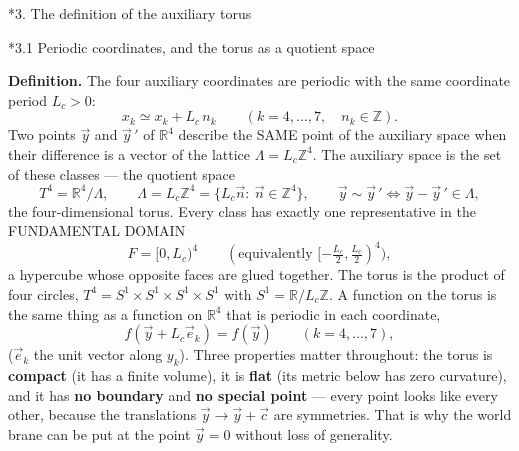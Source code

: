 \documentclass[10pt,a4paper]{article}
\makeatletter
\renewcommand\section{\@startsection{section}{1}{\z@}{-3.5ex \@plus -1ex \@minus -.2ex}{2.3ex \@plus.2ex}{\normalfont\Large\bfseries\raggedright}}
\renewcommand\subsection{\@startsection{subsection}{2}{\z@}{-3.25ex\@plus -1ex \@minus -.2ex}{1.5ex \@plus .2ex}{\normalfont\large\bfseries\raggedright}}
\makeatother
\begin{document}
\section*{3. The definition of the auxiliary torus}
\subsection*{3.1 Periodic coordinates, and the torus as a quotient space}
\textbf{Definition.} The four auxiliary coordinates are periodic with the same coordinate period $L_c>0$:
\begin{equation*}
x_k\simeq x_k+L_c\,n_k\qquad(k=4,\dots,7,\quad n_k\in\mathbb Z).
\end{equation*}
Two points $\vec y$ and $\vec y\,'$ of $\mathbb R^4$ describe the SAME point of the auxiliary space when their difference is a vector of the lattice $\Lambda=L_c\mathbb Z^4$. The auxiliary space is the set of these classes — the quotient space
\begin{equation*}
T^4=\mathbb R^4/\Lambda,\qquad \Lambda=L_c\mathbb Z^4=\{L_c\vec n:\ \vec n\in\mathbb Z^4\},\qquad \vec y\sim\vec y\,'\iff\vec y-\vec y\,'\in\Lambda,
\end{equation*}
the four-dimensional torus. Every class has exactly one representative in the FUNDAMENTAL DOMAIN
\begin{equation*}
F=[0,L_c)^4\qquad(\text{equivalently }[-\tfrac{L_c}2,\tfrac{L_c}2)^4),
\end{equation*}
a hypercube whose opposite faces are glued together. The torus is the product of four circles, $T^4=S^1\times S^1\times S^1\times S^1$ with $S^1=\mathbb R/L_c\mathbb Z$. A function on the torus is the same thing as a function on $\mathbb R^4$ that is periodic in each coordinate,
\begin{equation*}
f(\vec y+L_c\vec e_k)=f(\vec y)\qquad(k=4,\dots,7),
\end{equation*}
($\vec e_k$ the unit vector along $y_k$). Three properties matter throughout: the torus is \textbf{compact} (it has a finite volume), it is \textbf{flat} (its metric below has zero curvature), and it has \textbf{no boundary} and \textbf{no special point} — every point looks like every other, because the translations $\vec y\to\vec y+\vec c$ are symmetries. That is why the world brane can be put at the point $\vec y=0$ without loss of generality.
\end{document}
